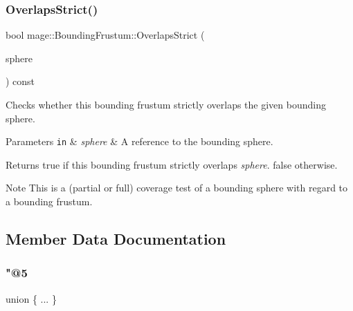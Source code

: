 \subsubsection{\texorpdfstring{Overlaps\+Strict()}{OverlapsStrict()}\hspace{0.1cm}{\footnotesize\ttfamily [2/2]}}
{\footnotesize\ttfamily bool mage\+::\+Bounding\+Frustum\+::\+Overlaps\+Strict (\begin{DoxyParamCaption}\item[{const \hyperlink{classmage_1_1_bounding_sphere}{Bounding\+Sphere} \&}]{sphere }\end{DoxyParamCaption}) const\hspace{0.3cm}{\ttfamily [noexcept]}}

Checks whether this bounding frustum strictly overlaps the given bounding sphere.


\begin{DoxyParams}[1]{Parameters}
\mbox{\tt in}  & {\em sphere} & A reference to the bounding sphere. \\
\hline
\end{DoxyParams}
\begin{DoxyReturn}{Returns}
{\ttfamily true} if this bounding frustum strictly overlaps {\itshape sphere}. {\ttfamily false} otherwise. 
\end{DoxyReturn}
\begin{DoxyNote}{Note}
This is a (partial or full) coverage test of a bounding sphere with regard to a bounding frustum. 
\end{DoxyNote}


\subsection{Member Data Documentation}
\hypertarget{classmage_1_1_bounding_frustum_aaadbb2d466a2006f6bae9dbb3dca0b70}{}\label{classmage_1_1_bounding_frustum_aaadbb2d466a2006f6bae9dbb3dca0b70} 
\subsubsection{\texorpdfstring{"@5}{@5}}
{\footnotesize\ttfamily union \{ ... \} \hspace{0.3cm}{\ttfamily [private]}}

\hypertarget{classmage_1_1_bounding_frustum_ae416db4ef5c2fc3eb2e2f25f6e45e747}{}\label{classmage_1_1_bounding_frustum_ae416db4ef5c2fc3eb2e2f25f6e45e747} 
